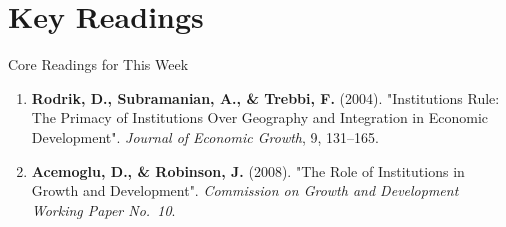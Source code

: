 \documentclass[10pt]{beamer}
\begin{document}
\section*{Key Readings}

\begin{frame}{Core Readings for This Week}
\footnotesize
\begin{enumerate}
\item \textbf{Rodrik, D., Subramanian, A., \& Trebbi, F.} (2004). "Institutions Rule: The Primacy of Institutions Over Geography and Integration in Economic Development". \emph{Journal of Economic Growth}, 9, 131--165.
\item \textbf{Acemoglu, D., \& Robinson, J.} (2008). "The Role of Institutions in Growth and Development". \emph{Commission on Growth and Development Working Paper No.\ 10}.
\end{enumerate}
\end{frame}
\end{document}
